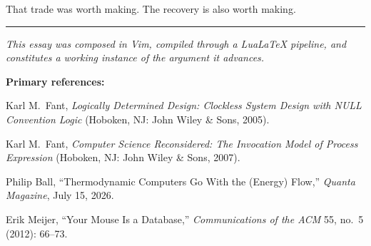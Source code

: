 \documentclass[12pt, a4paper]{article}
\begin{document}
That trade was worth making. The recovery is also worth making.

\vspace{2em}
\begin{center}\rule{0.4\textwidth}{0.4pt}\end{center}
\vspace{1em}

\noindent\textit{This essay was composed in Vim, compiled through a
LuaLaTeX pipeline, and constitutes a working instance of the argument
it advances.}

\vspace{2em}
\noindent\textbf{Primary references:}

\noindent Karl M.\ Fant, \textit{Logically Determined Design: Clockless
System Design with NULL Convention Logic} (Hoboken, NJ: John Wiley \&
Sons, 2005).

\smallskip
\noindent Karl M.\ Fant, \textit{Computer Science Reconsidered: The
Invocation Model of Process Expression} (Hoboken, NJ: John Wiley \&
Sons, 2007).

\smallskip
\noindent Philip Ball, ``Thermodynamic Computers Go With the
(Energy) Flow,'' \textit{Quanta Magazine}, July 15, 2026.

\smallskip
\noindent Erik Meijer, ``Your Mouse Is a Database,''
\textit{Communications of the ACM} 55, no.\ 5 (2012): 66--73.
\end{document}

